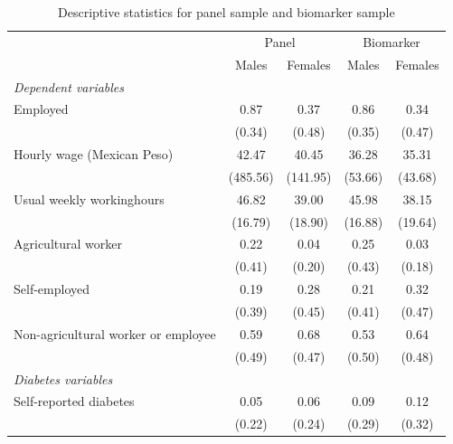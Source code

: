 \documentclass[12pt,english]{article}
\begin{document}
{\begin{table}[!ht]
\caption{\label{tab:Pooled-sample-characteristics}Descriptive statistics for panel sample and biomarker sample}
\begin{center}

\begin{adjustbox}{max width=\textwidth}
{
\def\sym#1{\ifmmode^{#1}\else\(^{#1}\)\fi}
\begin{tabular}{l*{4}{c}}
\toprule
                    &\multicolumn{2}{c}{Panel}&\multicolumn{2}{c}{Biomarker}\\\cmidrule(lr){2-3}\cmidrule(lr){4-5}
                    &\multicolumn{1}{c}{Males}&\multicolumn{1}{c}{Females}&\multicolumn{1}{c}{Males}&\multicolumn{1}{c}{Females}\\
                    \midrule
\hspace*{10mm}\emph{Dependent variables}&& \\
Employed            &        0.87&        0.37&        0.86&        0.34\\
                    &      (0.34)&      (0.48)&      (0.35)&      (0.47)\\
Hourly wage (Mexican Peso)        &       42.47&       40.45&       36.28&       35.31\\
                    &    (485.56)&    (141.95)&     (53.66)&     (43.68)\\
Usual weekly workinghours&       46.82&       39.00&       45.98&       38.15\\
                    &     (16.79)&     (18.90)&     (16.88)&     (19.64)\\
Agricultural worker &        0.22&        0.04&        0.25&        0.03\\
                    &      (0.41)&      (0.20)&      (0.43)&      (0.18)\\
Self-employed       &        0.19&        0.28&        0.21&        0.32\\
                    &      (0.39)&      (0.45)&      (0.41)&      (0.47)\\
Non-agricultural worker or employee&        0.59&        0.68&        0.53&        0.64\\
					&      (0.49)&      (0.47)&      (0.50)&      (0.48)\\
\hspace*{10mm}\emph{Diabetes variables}&&&& \\
Self-reported diabetes  &        0.05&        0.06&        0.09&        0.12\\
                    &      (0.22)&      (0.24)&      (0.29)&      (0.32)\\

\end{tabular}}
\end{adjustbox}
\end{center}
\end{table}}
\end{document}
